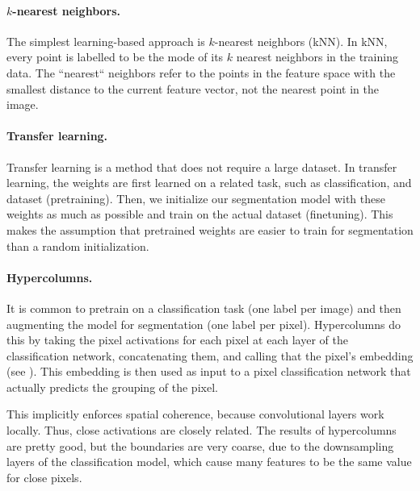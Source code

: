 \paragraph{$k$-nearest neighbors.}

The simplest learning-based approach is $k$-nearest neighbors (kNN). In kNN,
every point is labelled to be the mode of its $k$ nearest neighbors in the
training data. The ``nearest`` neighbors refer to the points in the feature
space with the smallest distance to the current feature vector, not the
nearest point in the image.

\paragraph{Transfer learning.}

Transfer learning is a method that does not require a large
dataset. In transfer learning, the weights are first learned on a
related task, such as classification, and dataset (pretraining). Then, we
initialize our segmentation model with these weights as much as possible and
train on the actual dataset (finetuning). This makes the assumption that
pretrained weights are easier to train for segmentation than a random
initialization.

\paragraph{Hypercolumns.}

It is common to pretrain on a classification task (one label per image) and
then augmenting the model for segmentation (one label per pixel). Hypercolumns
do this by taking the pixel activations for each pixel at each layer of the
classification network, concatenating them, and calling that the pixel's
embedding (see ). This
embedding is then used as input to a pixel classification network that actually
predicts the grouping of the pixel.

This implicitly enforces spatial coherence, because convolutional layers work
locally. Thus, close activations are closely related. The results of
hypercolumns are pretty good, but the boundaries are very coarse, due to the
downsampling layers of the classification model, which cause many features to
be the same value for close pixels.

